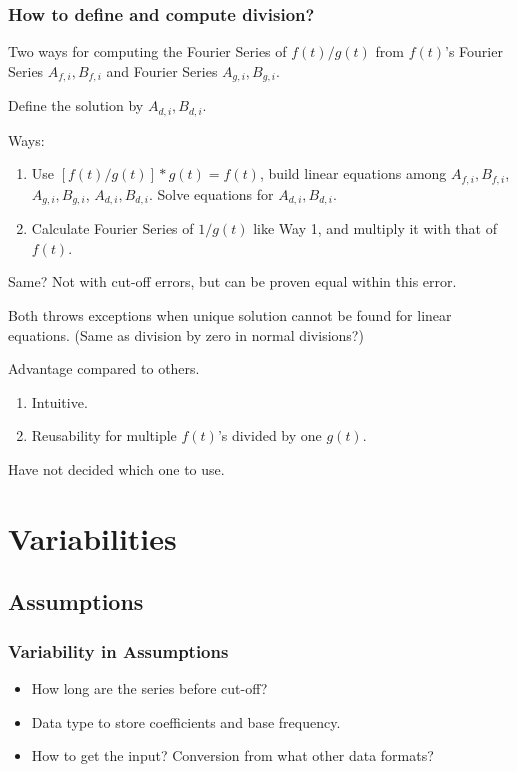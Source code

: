 \documentclass{beamer}
\begin{document}
	\begin{frame}
		\frametitle{How to define and compute division?}
		Two ways for computing the Fourier Series of $f(t)/g(t)$ from $f(t)$'s Fourier Series $A_{f,i}, B_{f,i}$ and Fourier Series $A_{g,i}, B_{g,i}$.
		
		Define the solution by $A_{d,i}, B_{d,i}$.
		
		Ways:
		\begin{enumerate}[W{a}y 1.]
		\item Use $[f(t)/g(t)] * g(t) = f(t)$, build linear equations among $A_{f,i}, B_{f,i}$, $A_{g,i}, B_{g,i}$, $A_{d,i}, B_{d,i}$. Solve equations for $A_{d,i}, B_{d,i}$.

		\item Calculate Fourier Series of $1/g(t)$ like Way 1, and multiply it with that of $f(t)$.
		\end{enumerate}
		Same? Not with cut-off errors, but can be proven equal within this error.
		
		Both throws exceptions when unique solution cannot be found for linear equations. (Same as division by zero in normal divisions?)
		
		Advantage compared to others.
		\begin{enumerate}[W{a}y 1.]
			\item Intuitive.
			\item Reusability for multiple $f(t)$'s divided by one $g(t)$.
		\end{enumerate}
		Have not decided which one to use.
		
	\end{frame}

	\section{Variabilities}
		\subsection{Assumptions}
		\begin{frame}
		\frametitle{Variability in Assumptions}
		\begin{itemize}
			\item How long are the series before cut-off?
			\item Data type to store coefficients and base frequency.
			\item How to get the input? Conversion from what other data formats?
		\end{itemize}
		\end{frame}
	
\end{document}
